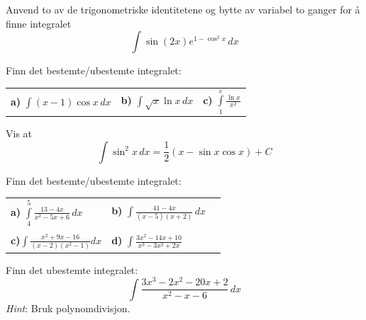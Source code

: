 Anvend to av de trigonometriske identitetene og bytte av variabel to ganger for å finne integralet
\[ \int \sin (2x) e^{1-\cos^2 x}\,dx \]\vs


Finn det bestemte/ubestemte integralet:\os
\begin{tabular}{@{}l l l}	
	\textbf{a)} $\displaystyle \int (x-1)\cos x \, dx$&\quad	\textbf{b)} $\displaystyle \int \sqrt{x}\ln x\,dx $ &\quad\textbf{c)} $\displaystyle \int\limits_1^e  \frac{\ln x}{x^2} $ 
\end{tabular}

Vis at
\[ \int \sin^2 x\,dx=\frac{1}{2}(x-\sin x \cos x)+C \]\vs

\newpage
{}
Finn det bestemte/ubestemte integralet:\os

\begin{tabular}{@{}l l l}	
	\textbf{a)} $ \displaystyle \int\limits_4^5 \frac{13-4x}{x^2-5x+6}\,dx $	&\quad \textbf{b)} $ \displaystyle \int \frac{41 - 4 x}{(x - 5) (x + 2)}\, dx $ \\ \\
	\textbf{c)}$\displaystyle \int\limits \frac{x^2+9x-16}{(x-2)(x^2-1)} dx$  &\quad \textbf{d)} $ \displaystyle \int\frac{3 x^2 - 14 x + 10}{x^3 - 3 x^2 + 2 x} $
\end{tabular}

Finn det ubestemte integralet:
\[\int \frac{3 x^3 - 2 x^2 - 20 x + 2}{x^2-x-6}\,dx \]
\textsl{Hint}: Bruk polynomdivisjon.

